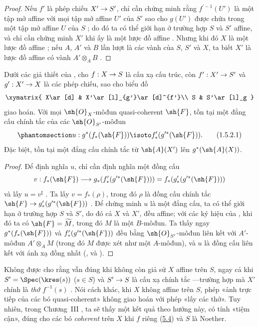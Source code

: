 \documentclass[oneside,10pt]{amsart}
\makeatletter
\newcommand{\ega@arrow}[2]{\mathchoice{#1}{#2}{#2}{#2}}
\renewcommand{\to}{\ega@arrow{\longrightarrow}{\rightarrow}}
\newcommand{\oldpage}[2][]{\marginnote{\normalfont\footnotesize\textbf{#1}~|~#2}\ignorespaces}
\let\EGAOriginalLabel\label
\renewcommand{\label}[1]{\phantomsection\EGAOriginalLabel{#1}}
\makeatother
\begin{document}
\begin{proof}
Nếu $f'$ là phép chiếu $X'\to S'$, chỉ cần chứng minh rằng $f^{\prime-1}(U')$ là một tập mở affine với mọi tập mở affine $U'$ của $S'$ sao cho $g(U')$ được chứa trong một tập mở affine $U$ của $S$ ; do đó ta có thể giới hạn ở trường hợp $S$ và $S'$ affine, và chỉ cần chứng minh $X'$ khi ấy là một lược đồ affine .
Nhưng khi đó $X$ là một lược đồ affine ; nếu $A$, $A'$ và $B$ lần lượt là các vành của $S$, $S'$ và $X$, ta biết $X'$ là lược đồ affine có vành $A'\otimes_A B$ .
\end{proof}

\begin{corollary}[1.5.2]
\label{II.1.5.2}
Dưới các giả thiết của , cho $f:X\to S$ là cấu xạ cấu trúc, còn $f':X'\to S'$ và $g':X'\to X$ là các phép chiếu, sao cho biểu đồ
\[
  \xymatrix{
    X\ar[d] &
    X'\ar[l]_{g'}\ar[d]^{f'}\\
    S &
    S'\ar[l]_g
  }
\]
giao hoán.
Với mọi $\sh{O}_X$-môđun quasi-coherent $\sh{F}$, tồn tại một đẳng cấu chính tắc của các $\sh{O}_{S'}$-môđun
\[
\label{II.1.5.2.1}
  u:g^*(f_*(\sh{F}))\isoto f'_*(g^{\prime*}(\sh{F})).
  \tag{1.5.2.1}
\]
Đặc biệt, tồn tại một đẳng cấu chính tắc từ $\sh{A}(X')$ lên $g^*(\sh{A}(X))$.
\end{corollary}

\begin{proof}
Để định nghĩa $u$, chỉ cần định nghĩa một đồng cấu
\[
  v:f_*(\sh{F})\to
  g_*(f'_*(g^{\prime*}(\sh{F})))
  =f_*(g'_*(g^{\prime*}(\sh{F})))
\]
và lấy $u=v^\sharp$ .
Ta lấy $v=f_*(\rho)$, trong đó $\rho$ là đồng cấu chính tắc $\sh{F}\to g'_*(g^{\prime*}(\sh{F}))$ .
Để chứng minh $u$ là một đẳng cấu, ta có thể giới hạn ở trường hợp $S$ và $S'$, do đó cả $X$ và $X'$, đều affine; với các ký hiệu của , khi đó ta có $\sh{F}=\widetilde{M}$, trong đó $M$ là một $B$-môđun.
Ta thấy ngay $g^*(f_*(\sh{F}))$ và $f'_*(g^{\prime*}(\sh{F}))$ đều bằng $\sh{O}_{S'}$-môđun liên kết với $A'$-môđun $A'\otimes_A M$ (trong đó $M$ được xét như một $A$-môđun), và $u$ là đồng cấu liên kết với ánh xạ đồng nhất (,  và ).
\end{proof}

\begin{remark}[1.5.3]
\label{II.1.5.3}
Không được cho rằng  vẫn đúng khi không còn giả sử $X$ affine trên $S$, ngay cả khi $S'=\Spec(\kres(s))$ ($s\in S$) và $S'\to S$ là cấu xạ chính tắc ---trường hợp mà $X'$ chính là \emph{thớ $f^{-1}(s)$} .
Nói cách khác, khi $X$ không affine trên $S$, phép
\oldpage[II]{13}
«ảnh trực tiếp của các bó quasi-coherent» không giao hoán với phép «lấy các thớ».
Tuy nhiên, trong Chương~III , ta sẽ thấy một kết quả theo hướng này, có tính «tiệm cận», đúng cho các bó \emph{coherent} trên $X$ khi $f$ riêng (\hyperref[subsection:II.5.4]{5.4}) và $S$ là Noether.
\end{remark}
\end{document}
